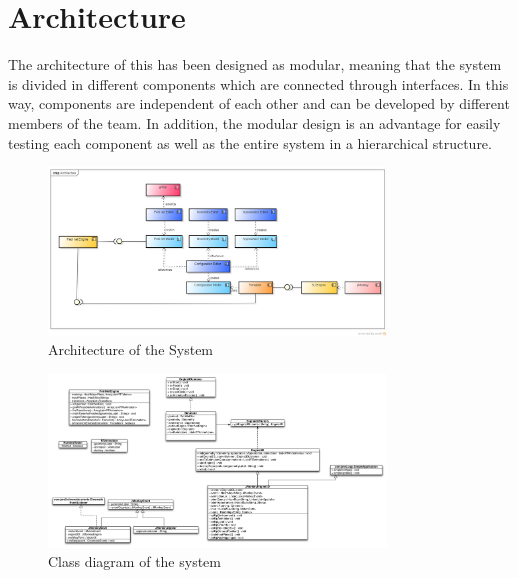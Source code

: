 \section{Architecture}
\label{sec:architecture}
The architecture of this \epns has been designed as modular, meaning that the system is divided in different components which are connected through interfaces. In this way, components are independent of each other and can be developed by different members of the team. In addition, the modular design is an advantage for easily testing each component as well as the entire system in a hierarchical structure.     

\begin{figure}[htp]
\begin{center}
  \includegraphics[width=0.8\textwidth]{image/cd-architecture.png}
  \caption{Architecture of the System}
  \label{fig:architecture}
\end{center}
\end{figure}

\begin{figure}[htp]
\begin{center}
  \includegraphics[width=0.8\textwidth]{image/domain.pdf}
  \caption{Class diagram of the system}
  \label{fig:class-diagram}
\end{center}
\end{figure}









